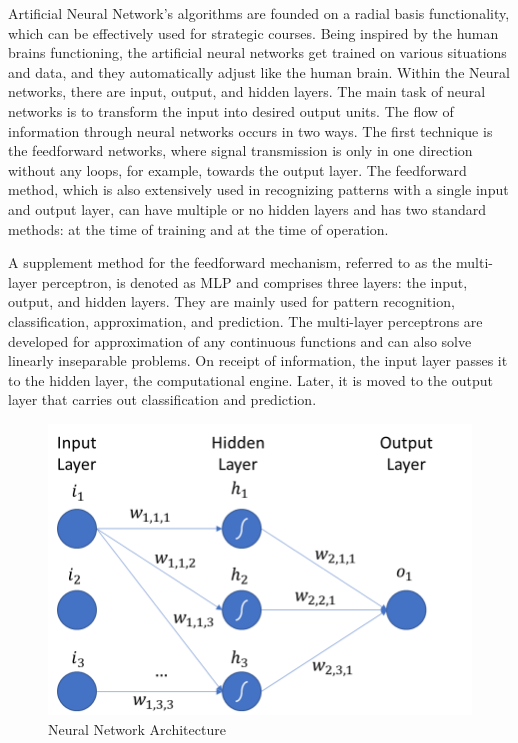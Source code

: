 \documentclass[10pt,conference,a4paper]{IEEEtran}
\begin{document}
Artificial Neural Network’s algorithms are founded on a radial basis functionality, which can be effectively used for strategic courses. Being inspired by the human brains functioning, the artificial neural networks get trained on various situations and data, and they automatically adjust like the human brain. Within the Neural networks, there are input, output, and hidden layers. The main task of neural networks is to transform the input into desired output units. The flow of information through neural networks occurs in two ways. The first technique is the feedforward networks, where signal transmission is only in one direction without any loops, for example, towards the output layer. The feedforward method, which is also extensively used in recognizing patterns with a single input and output layer, can have multiple or no hidden layers and has two standard methods: at the time of training and at the time of operation. 

A supplement method for the feedforward mechanism, referred to as the multi-layer perceptron, is denoted as MLP and comprises three layers: the input, output, and hidden layers. They are mainly used for pattern recognition, classification, approximation, and prediction. The multi-layer perceptrons are developed for approximation of any continuous functions and can also solve linearly inseparable problems. On receipt of information, the input layer passes it to the hidden layer, the computational engine. Later, it is moved to the output layer that carries out classification and prediction\cite{yang2020}. 

\begin{figure}[h]
    \centering
    \includegraphics[width=0.9\columnwidth]{multilayer perceptron.png}
    \caption{Neural Network Architecture}
    \label{fig:Neural Network Layers}
\end{figure}
\end{document}
